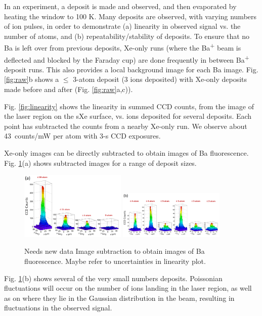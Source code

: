\documentclass[aps,pra,reprint,superscriptaddress]{revtex4-1}
\begin{document}
In an experiment, a deposit is made and observed, and then evaporated by heating the window to 100 K.  Many deposits are observed, with varying numbers of ion pulses, in order to demonstrate (a) linearity in observed signal vs. the number of atoms, and (b) repeatability/stability of deposits.  To ensure that no Ba is left over from previous deposits, Xe-only runs (where the Ba\textsuperscript{+} beam is deflected and blocked by the Faraday cup) are done frequently in between Ba\textsuperscript{+} deposit runs.  This also provides a local background image for each Ba image.  Fig. \ref{fig:raw}b shows a $\leq$ 3-atom deposit (3 ions deposited) with Xe-only deposits made before and after (Fig. \ref{fig:raw}a,c)).

Fig. \ref{fig:linearity} shows the linearity in summed CCD counts, from the image of the laser region on the sXe surface, vs. ions deposited for several deposits.  Each point has subtracted the counts from a nearby Xe-only run.  We observe about 43~counts/mW per atom with 3-s CCD exposures.

Xe-only images can be directly subtracted to obtain images of Ba fluorescence.  Fig. \ref{fig:lego}(a) shows subtracted images for a range of deposit sizes.  

\begin{figure}[h!tb]
	\includegraphics[width=0.45\textwidth]{figures/lego_varying.png}
	\includegraphics[width=0.45\textwidth]{figures/lego_statistical.png}
	\caption{{\color{red}Needs new data}  Image subtraction to obtain images of Ba fluorescence.  {\color{gray}Maybe refer to uncertainties in linearity plot.}}
	\label{fig:lego}
\end{figure}

Fig. \ref{fig:lego}(b) shows several of the very small numbers deposits.  Poissonian fluctuations will occur on the number of ions landing in the laser region, as well as on where they lie in the Gaussian distribution in the beam, resulting in fluctuations in the observed signal.
\end{document}
